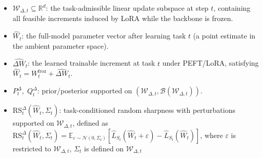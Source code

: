 \documentclass[10pt]{article} %
\begin{document}
\begin{itemize}


\item $\mathcal W_{\Delta,t}\subseteq\mathbb R^d$: the task-admissible linear update subspace at step $t$, containing all feasible increments induced by LoRA while the backbone is frozen.


\item $\widehat W_t$: the full-model parameter vector after learning task $t$ (a point estimate in the ambient parameter space).
\item $\widehat{\Delta W}_t$: the learned trainable increment at task $t$ under PEFT/LoRA, satisfying $\widehat W_t = W_t^{\mathrm{froz}} + \widehat{\Delta W}_t$.

 


 
\item $P_t^\Delta,\;Q_t^\Delta$: prior/posterior supported on $(\mathcal W_{\Delta,t},\mathcal B(\mathcal W_{\Delta,t}))$.




\item $\mathrm{RS}_t^\Delta(\widehat W_t,\Sigma_t)$: task-conditioned random sharpness with perturbations supported on $\mathcal W_{\Delta,t}$, defined as
$\mathrm{RS}_t^\Delta(\widehat W_t,\Sigma_t)=\mathbb E_{\varepsilon\sim\mathcal N(0,\Sigma_t)}[\hat L_{S_t}(\widehat W_t+\varepsilon)-\hat L_{S_t}(\widehat W_t)]$,
where $\varepsilon$ is restricted to $\mathcal W_{\Delta,t}$, $\Sigma_t$ is defined on $\mathcal{W}_{\Delta,t}$



\end{itemize}
\end{document}
